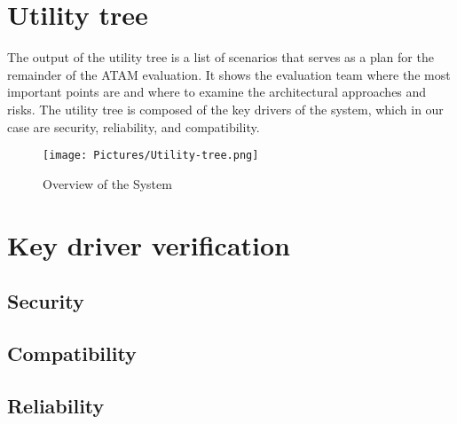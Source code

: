 
\section{Utility tree}
The output of the utility tree is a list of scenarios that serves as a plan
for the remainder of the ATAM evaluation. It shows the evaluation team
where the most important points are and where to examine the architectural
approaches and risks. The utility tree is composed of the key drivers of the
system, which in our case are security, reliability, and compatibility.

\begin{figure}[H]
  \centering
  \texttt{[image: Pictures/Utility-tree.png]}
  \caption{Overview of the System}
  \label{fig:system}
\end{figure}

\section{Key driver verification}
\subsection{Security}
\subsection{Compatibility}
\subsection{Reliability}